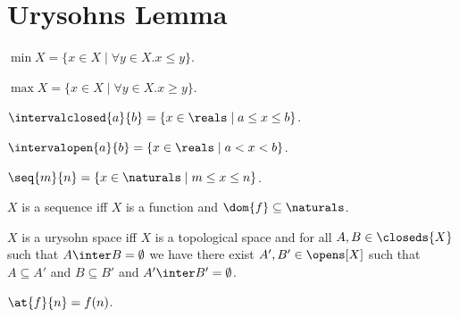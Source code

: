 














\section{Urysohns Lemma}

\begin{definition}\label{minimum}
    $\min{X} = \{x \in X \mid \forall y \in X. x \leq y \}$.
\end{definition}


\begin{definition}\label{maximum}
    $\max{X} = \{x \in X \mid \forall y \in X. x \geq y \}$.
\end{definition}


\begin{definition}\label{intervalclosed}
    $\intervalclosed{a}{b} = \{x \in \reals \mid a \leq x \leq b\}$.
\end{definition}


\begin{definition}\label{intervalopen}
    $\intervalopen{a}{b} = \{ x \in \reals \mid a < x < b\}$.
\end{definition}


\begin{definition}\label{one_to_n_set}
    $\seq{m}{n} = \{x \in \naturals \mid  m \leq x \leq n\}$.   
\end{definition}


\begin{definition}\label{sequence}
    $X$ is a sequence iff $X$ is a function and $\dom{f} \subseteq \naturals$.
\end{definition}


\begin{abbreviation}\label{urysohnspace}
    $X$ is a urysohn space iff
    $X$ is a topological space and
    for all $A,B \in \closeds{X}$ such that $A \inter B = \emptyset$
    we have there exist $A',B' \in \opens[X]$
    such that  $A \subseteq A'$ and $B \subseteq B'$ and $A' \inter B' = \emptyset$.    
\end{abbreviation}


\begin{abbreviation}\label{at}
    $\at{f}{n} = f(n)$.
\end{abbreviation}


